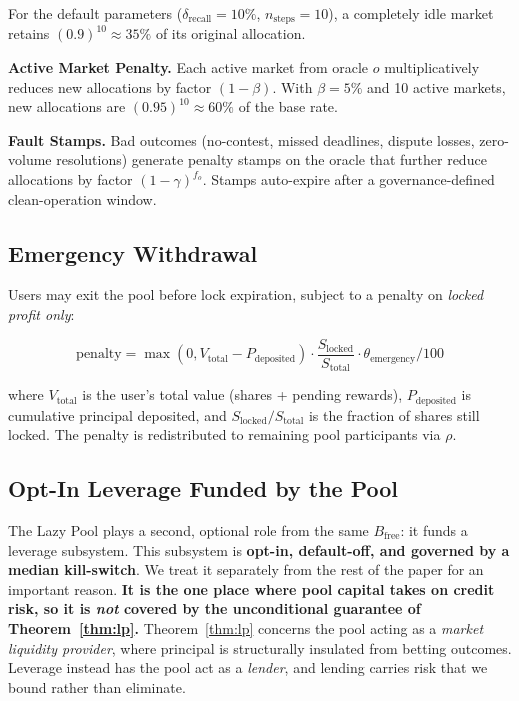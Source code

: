 \documentclass{ledger}
\theoremstyle{plain}
\theoremstyle{remark}
\begin{document}
For the default parameters ($\delta_{\text{recall}} = 10\%$, $n_{\text{steps}} =
10$), a completely idle market retains $(0.9)^{10} \approx 35\%$ of its original
allocation.

\textbf{Active Market Penalty.} Each active market from oracle $o$
multiplicatively reduces new allocations by factor $(1 - \beta)$. With $\beta =
5\%$ and 10 active markets, new allocations are $(0.95)^{10} \approx 60\%$ of the
base rate.

\textbf{Fault Stamps.} Bad outcomes (no-contest, missed deadlines, dispute
losses, zero-volume resolutions) generate penalty stamps on the oracle that
further reduce allocations by factor $(1 - \gamma)^{f_o}$. Stamps auto-expire
after a governance-defined clean-operation window.

\subsection{Emergency Withdrawal}

Users may exit the pool before lock expiration, subject to a penalty on
\emph{locked profit only}:

\[
\text{penalty} = \max(0, V_{\text{total}} - P_{\text{deposited}}) \cdot
\frac{S_{\text{locked}}}{S_{\text{total}}} \cdot \theta_{\text{emergency}} / 100
\]

where $V_{\text{total}}$ is the user's total value (shares + pending rewards),
$P_{\text{deposited}}$ is cumulative principal deposited, and $S_{\text{locked}}
/ S_{\text{total}}$ is the fraction of shares still locked. The penalty is
redistributed to remaining pool participants via $\rho$.

\subsection{Opt-In Leverage Funded by the Pool}\label{sec:leverage}

The Lazy Pool plays a second, optional role from the same $B_{\text{free}}$: it
funds a leverage subsystem. This subsystem is \textbf{opt-in, default-off, and
governed by a median kill-switch}. We treat it separately from the rest of the
paper for an important reason. \textbf{It is the one place where pool capital
takes on credit risk, so it is \emph{not} covered by the unconditional guarantee
of Theorem~\ref{thm:lp}.} Theorem~\ref{thm:lp} concerns the pool acting as a
\emph{market liquidity provider}, where principal is structurally insulated from
betting outcomes. Leverage instead has the pool act as a \emph{lender}, and
lending carries risk that we bound rather than eliminate.
\end{document}
